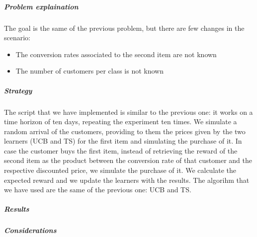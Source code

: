 \subparagraph*{Problem explaination}
The goal is the same of the previous problem, but there are few changes in the scenario:
\begin{itemize}
	\item The conversion rates associated to the second item are not known
	\item The number of customers per class is not known
\end{itemize}
\subparagraph*{Strategy}
The script that we have implemented is similar to the previous one: it works on a time horizon of ten days, repeating the experiment ten times. We simulate a random arrival of the customers, providing to them the prices given by the two learners (UCB and TS) for the first item and simulating the purchase of it. In case the customer buys the first item, instead of retrieving the reward of the second item as the product  between the conversion rate of that customer and the respective discounted price, 
we simulate the purchase of it. We calculate the expected reward and we update the learners with the results. 
The algorihm that we have used are the same of the previous one: UCB and TS.

\subparagraph*{Results}
\subparagraph*{Considerations}
